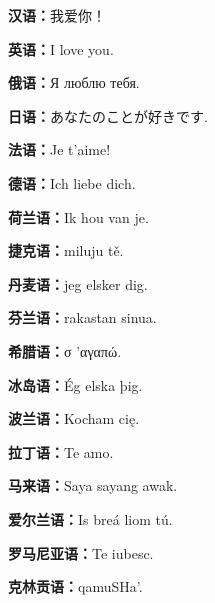 \documentclass[a4paper,UTF8]{ctexbook}
\begin{document}
	
	\textbf{汉语：}我爱你！
	
	\textbf{英语：}I love you.
	
	\textbf{俄语：}Я люблю тебя. 	
	
	\textbf{日语：}あなたのことが好きです.
	
	\textbf{法语：}Je t'aime!

	\textbf{德语：}Ich liebe dich.
	
	\textbf{荷兰语：}Ik hou van je.
	
	\textbf{捷克语：}miluju tě.
	
	\textbf{丹麦语：}jeg elsker dig.
	
	\textbf{芬兰语：}rakastan sinua.
	
	\textbf{希腊语：}σ 'αγαπώ.
	
	\textbf{冰岛语：}Ég elska þig.
	
	\textbf{波兰语：}Kocham cię.
	
	\textbf{拉丁语：}Te amo.
	
	\textbf{马来语：}Saya sayang awak.
		
	\textbf{爱尔兰语：}Is breá liom tú.
	
	\textbf{罗马尼亚语：}Te iubesc.
	
	\textbf{克林贡语：}qamuSHa'.
\end{document}
